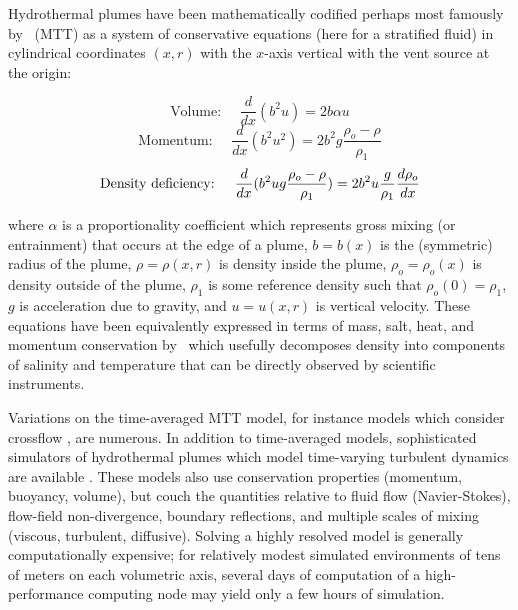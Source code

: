 Hydrothermal plumes have been mathematically codified perhaps most famously by~\cite{morton1956turbulent} (MTT) as a system of conservative equations (here for a stratified fluid) in cylindrical coordinates $(x, r)$ with the $x$-axis vertical with the vent source at the origin:

\begin{equation}
    \text{Volume: } \quad \frac{d}{dx}(b^2 u) = 2 b \alpha u
\end{equation}
\begin{equation}
    \text{Momentum: } \quad \frac{d}{dx}(b^2 u^2) = 2 b^2 g\frac{\rho_o - \rho}{\rho_1} 
\end{equation}
\begin{equation}
    \text{Density deficiency: } \quad \frac{d}{dx}\large(b^2 u g \frac{\rho_o - \rho}{\rho_1}\large) = 2 b^2 u \frac{g}{\rho_1}\frac{d\rho_o}{dx}
\end{equation}

\noindent where $\alpha$ is a proportionality coefficient which represents gross mixing (or entrainment) that occurs at the edge of a plume, $b = b(x)$ is the (symmetric) radius of the plume, $\rho = \rho(x, r)$ is density inside the plume, $\rho_o=\rho_o(x)$ is density outside of the plume, $\rho_1$ is some reference density such that $\rho_o(0) = \rho_1$, $g$ is acceleration due to gravity, and $u = u(x,r)$ is vertical velocity. These equations have been equivalently expressed in terms of mass, salt, heat, and momentum conservation by~\cite{speer1989model} which usefully decomposes density into components of salinity and temperature that can be directly observed by scientific instruments.

Variations on the time-averaged MTT model, for instance models which consider crossflow \autocite{tohidi2016highly}, are numerous. In addition to time-averaged models, sophisticated simulators of hydrothermal plumes which model time-varying turbulent dynamics are available \autocite{lavelle2013turbulent}. These models also use conservation properties (momentum, buoyancy, volume), but couch the quantities relative to fluid flow (Navier-Stokes), flow-field non-divergence, boundary reflections, and multiple scales of mixing (viscous, turbulent, diffusive). Solving a highly resolved model is generally computationally expensive; for relatively modest simulated environments of tens of meters on each volumetric axis, several days of computation of a high-performance computing node may yield only a few hours of simulation.

